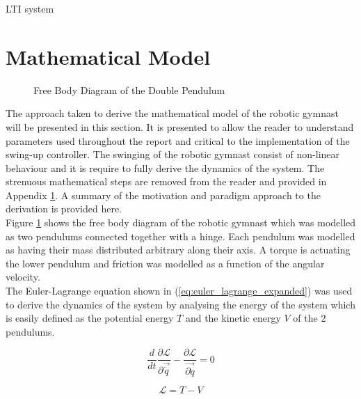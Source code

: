 LTI system


\section{Mathematical Model}
\label{sec:math_model}
\begin{figure}[h]
	\centering
	
	\caption{Free Body Diagram of the Double Pendulum}
	\label{fig:doublePen}
\end{figure}

The approach taken to derive the mathematical model of the robotic gymnast will be presented in this section. It is presented to allow the reader to understand parameters used throughout the report and critical to the implementation of the swing-up controller. The swinging of the robotic gymnast consist of non-linear behaviour and it is  require to fully derive the dynamics of the system. The strenuous mathematical steps are removed from the reader and provided in Appendix \ref{sec:math_model}. A summary of the motivation and paradigm approach to the derivation is provided here.\\

 Figure \ref{fig:doublePen} shows the free body diagram of the robotic gymnast which was modelled as two pendulums connected together with a hinge. Each pendulum was modelled as having their mass distributed arbitrary along their axis. A torque is actuating the lower pendulum and friction was modelled as a function of the angular velocity.\\

The Euler-Lagrange equation shown in (\ref{eq:euler_lagrange_expanded}) was used to derive the dynamics of the system by analysing the energy of the system which is easily defined as the potential energy $T$ and the kinetic energy $V$ of the 2 pendulums.
 
\begin{equation} \label{eq:euler_lagrange_expanded}
\frac{d}{dt}\frac{\partial\mathcal{L}}{\partial\vec{\dot{q}}}-\frac{\partial\mathcal{L}}{ \vec{\partial q}} = 0
\end{equation}

\begin{equation} \label{eq:euler_lagrane}
\mathcal{L}=T-V
\end{equation}

